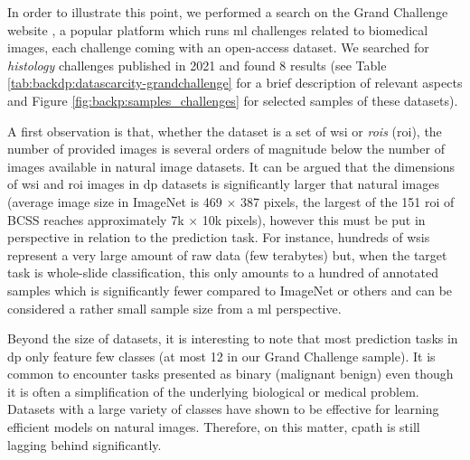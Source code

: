 In order to illustrate this point, we performed a search on the Grand Challenge website \cite{grandchallenge}, a popular platform which runs \acrlong{ml} challenges related to biomedical images, each challenge coming with an open-access dataset. We searched for \textit{histology} challenges published in 2021 and found 8 results (see Table \ref{tab:backdp:datascarcity-grandchallenge} for a brief description of relevant aspects and Figure \ref{fig:backp:samples_challenges} for selected samples of these datasets).

A first observation is that, whether the dataset is a set of \acrshort{wsi} or \textit{\acrlong{roi}s} (\acrshort{roi}), the number of provided images is several orders of magnitude below the number of images available in natural image datasets. It can be argued that the dimensions of \acrshort{wsi} and \acrshort{roi} images in \acrlong{dp} datasets is significantly larger that natural images (\eg average image size in ImageNet is 469 $\times$ 387 pixels, the largest of the 151 \acrshort{roi} of BCSS reaches approximately 7k $\times$ 10k pixels), however this must be put in perspective in relation to the prediction task. For instance, hundreds of \acrshort{wsi}s represent a very large amount of raw data (\eg few terabytes) but, when the target task is whole-slide classification, this only amounts to a hundred of annotated samples which is significantly fewer compared to ImageNet or others and can be considered a rather small sample size from a \acrshort{ml} perspective.  

Beyond the size of datasets, it is interesting to note that most prediction tasks in \acrlong{dp} only feature few classes (at most 12 in our Grand Challenge sample). It is common to encounter tasks presented as binary (\eg malignant \vs benign) even though it is often a simplification of the underlying biological or medical problem. Datasets with a large variety of classes have shown to be effective for learning efficient models on natural images. Therefore, on this matter, \acrlong{cpath} is still lagging behind significantly. 

